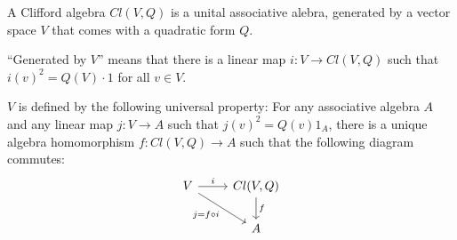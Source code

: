 \begin{definition}
  A Clifford algebra $Cl(V, Q)$ is a unital associative alebra, generated by a vector space $V$ that comes with a quadratic form $Q$.

  ``Generated by $V$'' means that there is a linear map $i \colon V \to Cl(V, Q)$ such that $i(v)^2 = Q(V) \cdot 1$ for all $v \in V$.

  $V$ is defined by the following universal property: For any associative algebra $A$ and any linear map $j\colon V \to A$ such that $j(v)^2 = Q(v) 1_A$, there is a unique algebra homomorphism $f\colon Cl(V, Q) \to A$ such that the following diagram commutes:
  \begin{equation}
    \begin{tikzcd}
      V \arrow{r}{i} \arrow[swap]{dr}{j = f \circ i} & Cl(V, Q) \arrow{d}{f} \\
		     & A
    \end{tikzcd}
  \end{equation}
\end{definition}
